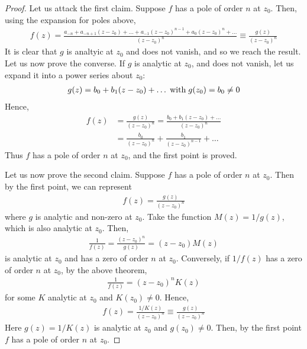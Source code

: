\begin{proof}
    Let us attack the first claim. Suppose $f$ has a pole of order $n$ at $z_0$. Then, using the expansion for poles above, 
    \begin{align*}
        f(z)=\frac{a_{-n}+a_{-n+1}(z-z_0)+\dots+a_{-1}(z-z_0)^{n-1}+a_0(z-z_0)^n+\dots}{(z-z_0)^n}\equiv \frac{g(z)}{(z-z_0)^n}
    \end{align*}
    It is clear that $g$ is analtyic at $z_0$ and does not vanish, and so we reach the result. Let us now prove the converse. If $g$ is analytic at $z_0$, and does not vanish, let us expand it
    into a power series about $z_0$:
    \begin{align*}
        g(z)=b_0+b_1(z-z_0)+\dots \;\textnormal{with}\; g(z_0)=b_0\neq0
    \end{align*}
    Hence,
    \begin{align*}
        f(z)&=\frac{g(z)}{(z-z_0)^n}=\frac{b_0+b_1(z-z_0)+\dots}{(z-z_0)^n}\\
        &=\frac{b_0}{(z-z_0)^n} + \frac{b_1}{(z-z_0)^{n-1}} + \dots
    \end{align*}
    Thus $f$ has a pole of order $n$ at $z_0$, and the first point is proved.

    Let us now prove the second claim.
    Suppose $f$ has a pole of order $n$ at $z_0$. Then by the first point, we can represent
    \begin{align*}
        f(z)=\frac{g(z)}{(z-z_0)^n}
    \end{align*}
    where $g$ is analytic and non-zero at $z_0$. Take the function $M(z)=1/g(z)$, which is also analytic at $z_0$. Then,
    \begin{align*}
        \frac{1}{f(z)}=\frac{(z-z_0)^n}{g(z)}=(z-z_0)M(z)
    \end{align*}
    is analytic at $z_0$ and has a zero of order $n$ at $z_0$. Conversely, if $1/f(z)$ has a zero of order $n$ at $z_0$, by the above theorem,
    \begin{align*}
        \frac{1}{f(z)}=(z-z_0)^n K(z)
    \end{align*}
    for some $K$ analytic at $z_0$ and $K(z_0)\neq0$. Hence,
    \begin{align*}
        f(z)=\frac{1/K(z)}{(z-z_0)^n}\equiv\frac{g(z)}{(z-z_0)^n}
    \end{align*}
    Here $g(z)=1/K(z)$ is analytic at $z_0$ and $g(z_0)\neq0$. Then, by the first point $f$ has  a pole of order $n$ at $z_0$.


\end{proof}
